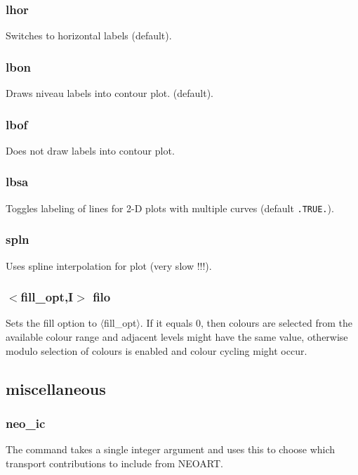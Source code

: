 \documentclass[a4paper,10pt]{report}
\begin{document}
\subsubsection{lhor}\label{sec:lhor}
Switches to horizontal labels (default).

\subsubsection{lbon}\label{sec:lbon}
Draws niveau labels into contour plot. (default).

\subsubsection{lbof}\label{sec:lbof}
Does not draw labels into contour plot.

\subsubsection{lbsa}\label{sec:lbsa}
Toggles labeling of lines for 2-D plots with multiple curves (default {\tt .TRUE.}).

\subsubsection{spln}\label{sec:spln}
Uses spline interpolation for plot (very slow !!!).

\subsubsection{$<$fill\_opt,{\bf I}$>$ filo}\label{sec:filo}
Sets the fill option to $\langle$fill\_opt$\rangle$.
If it equals 0, then colours
are selected from the available colour range and adjacent levels might
have the same value, otherwise modulo selection of colours is enabled
and colour cycling might occur.


\subsection{miscellaneous}\label{sec:miscellaneous}

\subsubsection{neo\_ic}\label{sec:neoic}
The command takes a single integer argument and uses this to choose which transport contributions to include from NEOART.
\end{document}
